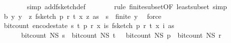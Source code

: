 \begin{isabellebody}
\ \ \ \ \ \ \isamarkupfalse%
\ {\isacharparenleft}{\kern0pt}simp\ add{\isacharcolon}{\kern0pt}f{}{\isacharunderscore}{\kern0pt}sketch{\isacharunderscore}{\kern0pt}def{\isacharparenright}{\kern0pt}\isanewline
\ \ \ \ \ \ \isamarkupfalse%
\ {\isacharparenleft}{\kern0pt}rule\ finite{\isacharunderscore}{\kern0pt}subset{\isacharbrackleft}{\kern0pt}OF\ least{\isacharunderscore}{\kern0pt}subset{\isacharbrackright}{\kern0pt}{\isacharcomma}{\kern0pt}\ simp{\isacharparenright}{\kern0pt}\isanewline
\ \ \ \ \isamarkupfalse%
\ b{\isacharunderscore}{\kern0pt}{}{\isacharcolon}{\kern0pt}\ {\isachardoublequoteopen}{\isasymAnd}y{\isachardot}{\kern0pt}\ y\ {\isasymin}\ {\isacharparenleft}{\kern0pt}{\isasymlambda}z{\isachardot}{\kern0pt}\ f{}{\isacharunderscore}{\kern0pt}sketch\ p\ r\ t\ {\isacharparenleft}{\kern0pt}x\ z{\isacharparenright}{\kern0pt}\ as{\isacharparenright}{\kern0pt}\ {\isacharbackquote}{\kern0pt}\ {\isacharbraceleft}{\kern0pt}{}{\isachardot}{\kern0pt}{\isachardot}{\kern0pt}{\isacharless}{\kern0pt}s{\isacharbraceright}{\kern0pt}\ {\isasymLongrightarrow}\ finite\ y{\isachardoublequoteclose}\ \isamarkupfalse%
\ force\isanewline
\isanewline
\ \ \ \ \isamarkupfalse%
\ {\isachardoublequoteopen}bit{\isacharunderscore}{\kern0pt}count\ {\isacharparenleft}{\kern0pt}encode{\isacharunderscore}{\kern0pt}state\ {\isacharparenleft}{\kern0pt}s{\isacharcomma}{\kern0pt}\ t{\isacharcomma}{\kern0pt}\ p{\isacharcomma}{\kern0pt}\ r{\isacharcomma}{\kern0pt}\ x{\isacharcomma}{\kern0pt}\ {\isasymlambda}i{\isasymin}{\isacharbraceleft}{\kern0pt}{}{\isachardot}{\kern0pt}{\isachardot}{\kern0pt}{\isacharless}{\kern0pt}s{\isacharbraceright}{\kern0pt}{\isachardot}{\kern0pt}\ f{}{\isacharunderscore}{\kern0pt}sketch\ p\ r\ t\ {\isacharparenleft}{\kern0pt}x\ i{\isacharparenright}{\kern0pt}\ as{\isacharparenright}{\kern0pt}{\isacharparenright}{\kern0pt}\ {\isacharequal}{\kern0pt}\isanewline
\ \ \ \ \ \ bit{\isacharunderscore}{\kern0pt}count\ {\isacharparenleft}{\kern0pt}N\isactrlsub S\ s{\isacharparenright}{\kern0pt}\ {\isacharplus}{\kern0pt}\ bit{\isacharunderscore}{\kern0pt}count\ {\isacharparenleft}{\kern0pt}N\isactrlsub S\ t{\isacharparenright}{\kern0pt}\ {\isacharplus}{\kern0pt}\ \ bit{\isacharunderscore}{\kern0pt}count\ {\isacharparenleft}{\kern0pt}N\isactrlsub S\ p{\isacharparenright}{\kern0pt}\ {\isacharplus}{\kern0pt}\ bit{\isacharunderscore}{\kern0pt}count\ {\isacharparenleft}{\kern0pt}N\isactrlsub S\ r{\isacharparenright}{\kern0pt}\ {\isacharplus}{\kern0pt}\isanewline

\end{isabellebody}
